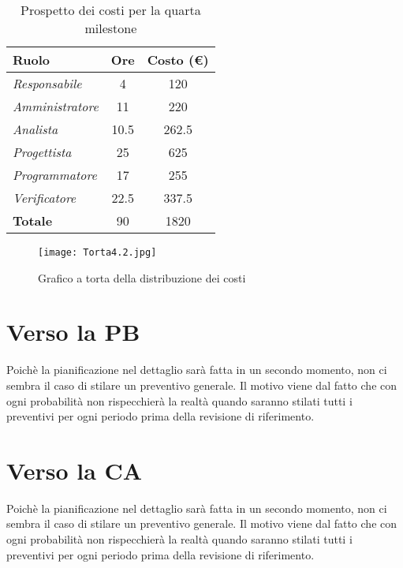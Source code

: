 \begin{table}[H]
    \centering
    \begin{tabular}{|l|c|c|}
    \hline
    \textbf{Ruolo} & \multicolumn{1}{l|}{\textbf{Ore}} & \multicolumn{1}{l|}{\textbf{Costo (€)}} \\ \hline
    \textit{Responsabile}   & 4    & 120     \\ \hline
    \textit{Amministratore} & 11   & 220     \\ \hline
    \textit{Analista}       & 10.5 & 262.5   \\ \hline
    \textit{Progettista}    & 25   & 625     \\ \hline
    \textit{Programmatore}  & 17   & 255     \\ \hline
    \textit{Verificatore}   & 22.5 & 337.5   \\ \hline
    \textbf{Totale}         & 90   & 1820    \\ \hline
    \end{tabular}
    \caption{Prospetto dei costi per la quarta milestone}
\end{table}

\begin{figure}[H]
    \texttt{[image: Torta4.2.jpg]}
    \caption{Grafico a torta della distribuzione dei costi}
\end{figure}


\section{Verso la PB}

Poichè la pianificazione nel dettaglio sarà fatta in un secondo momento, non ci sembra il caso di stilare un preventivo generale. Il motivo viene dal fatto che con ogni probabilità non rispecchierà la realtà quando saranno stilati tutti i preventivi per ogni periodo prima della revisione di riferimento.

\section{Verso la CA}

Poichè la pianificazione nel dettaglio sarà fatta in un secondo momento, non ci sembra il caso di stilare un preventivo generale. Il motivo viene dal fatto che con ogni probabilità non rispecchierà la realtà quando saranno stilati tutti i preventivi per ogni periodo prima della revisione di riferimento.
